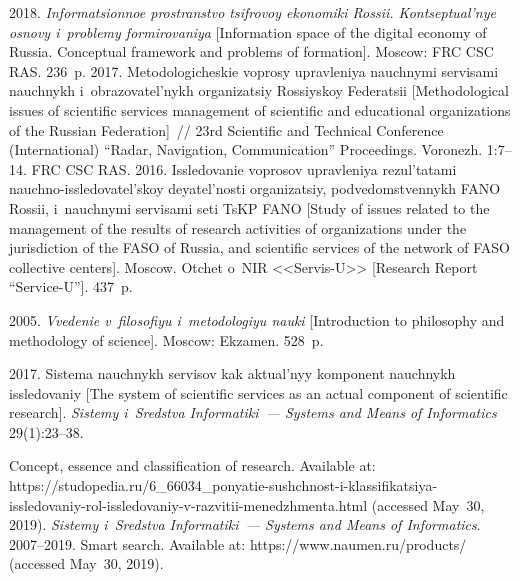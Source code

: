  \begin{multicols}{2}

\renewcommand{\bibname}{\protect\rmfamily References}

{\small\frenchspacing
 {%
 \begin{thebibliography}{9}
2018. \textit{Informatsionnoe prostranstvo tsifrovoy ekonomiki Rossii. 
Kontseptual'nye osnovy i~problemy formirovaniya} [Information space of the 
digital economy of Russia. Conceptual framework and problems of formation]. 
Moscow: FRC CSC RAS. 236~p. 
 2017. 
Metodologicheskie voprosy upravleniya nauchnymi servisami nauchnykh 
i~obrazovatel'nykh organizatsiy Rossiyskoy Federatsii [Methodological issues of 
scientific services management of scientific and educational organizations of the 
Russian Federation]~// 23rd Scientific and Technical Conference (International) 
``Radar, Navigation, Communication'' Proceedings. Voronezh. 1:7--14.
FRC CSC RAS. 2016. Issledovanie voprosov upravleniya rezul'tatami nauchno-issledovatel'skoy
deyatel'nosti organizatsiy, podvedomstvennykh FANO Rossii, i~nauchnymi servisami
seti TsKP FANO [Study of issues related to the management of the 
results of research activities of organizations under the jurisdiction of the FASO of Russia, and 
scientific services of the network of FASO collective centers]. Moscow.
Otchet o~NIR <<Servis-U>> [Research Report ``Service-U'']. 437~p.


 2005. \textit{Vvedenie v~filosofiyu i~metodologiyu nauki} 
[Introduction to philosophy and methodology of science]. Moscow: Ekzamen. 
528~p.

 2017. Sistema 
nauchnykh servisov kak aktual'nyy komponent nauchnykh issledovaniy [The 
system of scientific services as an actual component of scientific research]. 
\textit{Sistemy i~Sredstva Informatiki~--- Systems and Means of Informatics} 
29(1):23--38.

Concept, essence and classification of research. Available at: {\sf 
https://studopedia.ru/6\_66034\_ponyatie-sushchnost-i-klassifikatsiya-issledovaniy-rol-issledovaniy-v-razvitii-menedzhmenta.html} 
(accessed May~30, 2019).
\textit{Sistemy i~Sredstva Informatiki~--- Systems and Means of Informatics}. 
2007--2019.
Smart search. Available at: {\sf https://www.naumen.ru/\linebreak products/} (accessed 
May~30, 2019).
\end{thebibliography}

 }
 }

\end{multicols}

